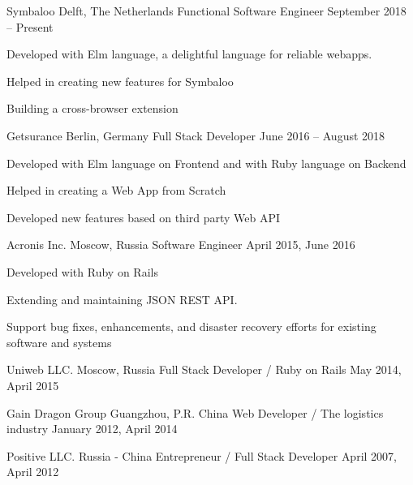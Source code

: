 \documentclass[11pt]{resume}
\begin{document}
\makecvheader[C]

\begin{cventries}

\end{cventries}


\begin{cventries}

\cventry
  {Symbaloo}
  {Delft, The Netherlands}
  {Functional Software Engineer}
  {September 2018 – Present}
  {
    \begin{cvitems}
    \item { Developed with Elm language, a delightful language
  for reliable webapps. }
    \item { Helped in creating new features for Symbaloo }
    \item { Building a cross-browser extension }
    \end{cvitems}
  }

\cventry
    {Getsurance}
    {Berlin, Germany}
    {Full Stack Developer}
    {June 2016 – August 2018} {
    \begin{cvitems}
    \item { Developed with Elm language on Frontend and with Ruby language on Backend }
    \item { Helped in creating a Web App from Scratch }
    \item { Developed new features based on third party Web API  }
    \end{cvitems}
  }

\cventry
  {Acronis Inc.}
  {Moscow, Russia}
  {Software Engineer}
  {April 2015, June 2016}
  {
    \begin{cvitems}
    \item { Developed with Ruby on Rails }
    \item { Extending and maintaining JSON REST API. }
    \item { Support bug fixes, enhancements, and disaster recovery 
    efforts for existing software and systems }
    \end{cvitems}
  }

\cventry
  {Uniweb LLC.}
  {Moscow, Russia}
  {Full Stack Developer / Ruby on Rails}
  {May 2014, April 2015}
  {}

\cventry
  {Gain Dragon Group}
  {Guangzhou, P.R. China}
  {Web Developer / The logistics industry }
  {January 2012, April 2014}
  {}

\cventry
  {Positive LLC.}
  {Russia - China}
  {Entrepreneur / Full Stack Developer}
  {April 2007, April 2012}
  {}

\end{cventries}
\end{document}
